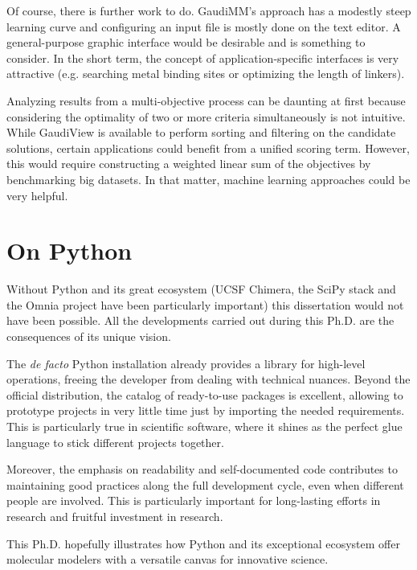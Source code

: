 Of course, there is further work to do. GaudiMM's approach has a modestly steep learning curve and configuring an input file is mostly done on the text editor. A general-purpose graphic interface would be desirable and is something to consider. In the short term, the concept of application-specific interfaces is very attractive (e.g. searching metal binding sites or optimizing the length of linkers).

Analyzing results from a multi-objective process can be daunting at first because considering the optimality of two or more criteria simultaneously is not intuitive. While GaudiView is available to perform sorting and filtering on the candidate solutions, certain applications could benefit from a unified scoring term. However, this would require constructing a weighted linear sum of the objectives by benchmarking big datasets. In that matter, machine learning approaches could be very helpful.


\section*{On Python}

Without Python and its great ecosystem (UCSF Chimera, the SciPy stack and the Omnia project have been particularly important) this dissertation would not have been possible. All the developments carried out during this Ph.D. are the consequences of its unique vision.

The \textit{de facto} Python installation already provides a library for high-level operations, freeing the developer from dealing with technical nuances. Beyond the official distribution, the catalog of ready-to-use packages is excellent, allowing to prototype projects in very little time just by importing the needed requirements. This is particularly true in scientific software, where it shines as the perfect glue language to stick different projects together.

Moreover, the emphasis on readability and self-documented code contributes to maintaining good practices along the full development cycle, even when different people are involved. This is particularly important for long-lasting efforts in research and fruitful investment in research.

This Ph.D. hopefully illustrates how Python and its exceptional ecosystem offer molecular modelers with a versatile canvas for innovative science.
